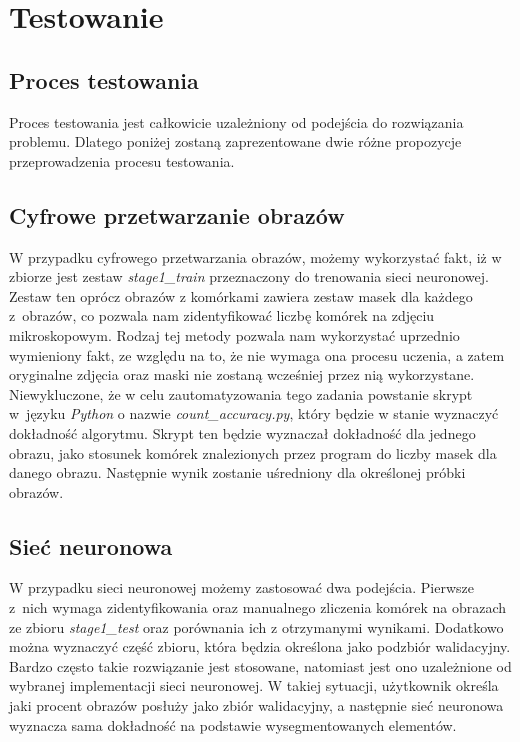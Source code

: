 \documentclass[a4paper]{article}
\begin{document}
\section{Testowanie}
\subsection{Proces testowania}
Proces testowania jest całkowicie uzależniony od podejścia do rozwiązania problemu. Dlatego poniżej zostaną zaprezentowane dwie różne propozycje przeprowadzenia procesu testowania.
\subsection{Cyfrowe przetwarzanie obrazów}
W przypadku cyfrowego przetwarzania obrazów, możemy wykorzystać fakt, iż w zbiorze jest zestaw \textit{stage1\_train} przeznaczony do trenowania sieci neuronowej. Zestaw ten oprócz obrazów z komórkami zawiera zestaw masek dla każdego z~obrazów, co pozwala nam zidentyfikować liczbę komórek na zdjęciu mikroskopowym. Rodzaj tej metody pozwala nam wykorzystać uprzednio wymieniony fakt, ze względu na to, że nie wymaga ona procesu uczenia, a zatem oryginalne zdjęcia oraz maski nie zostaną wcześniej przez nią wykorzystane.
\newline \newline
Niewykluczone, że w celu zautomatyzowania tego zadania powstanie skrypt w~języku \textit{Python} o nazwie \textit{count\_accuracy.py}, który będzie w stanie wyznaczyć dokładność algorytmu. Skrypt ten będzie wyznaczał dokładność dla jednego obrazu, jako stosunek komórek znalezionych przez program do liczby masek dla danego obrazu. Następnie wynik zostanie uśredniony dla określonej próbki obrazów.
\subsection{Sieć neuronowa}
 W przypadku sieci neuronowej możemy zastosować dwa podejścia. Pierwsze z~nich wymaga zidentyfikowania oraz manualnego zliczenia komórek na obrazach ze zbioru \textit{stage1\_test} oraz porównania ich z otrzymanymi wynikami.
 \newline \newline
 Dodatkowo można wyznaczyć część zbioru, która będzia określona jako podzbiór walidacyjny. Bardzo często takie rozwiązanie jest stosowane, natomiast jest ono uzależnione od wybranej implementacji sieci neuronowej. W takiej sytuacji, użytkownik określa jaki procent obrazów posłuży jako zbiór walidacyjny, a następnie sieć neuronowa wyznacza sama dokładność na podstawie wysegmentowanych elementów.
\label{end}
\end{document}
